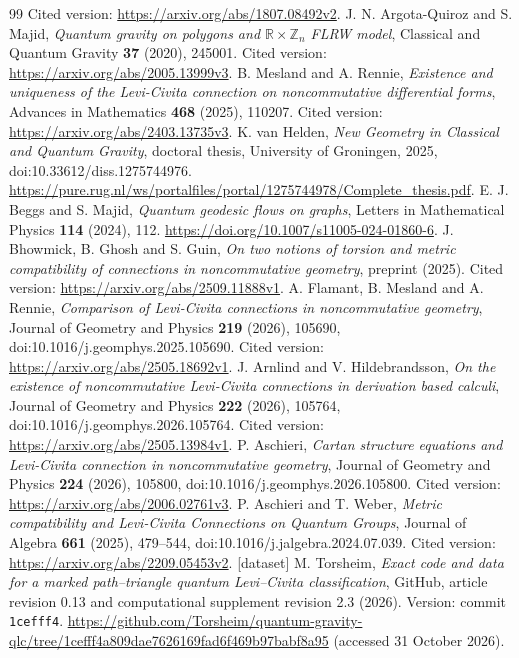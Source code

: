 \documentclass[11pt,a4paper]{article}
\theoremstyle{remark}\newtheorem{remark}[theorem]{Remark}
\begin{document}
\begin{thebibliography}{99}
Cited version: \url{https://arxiv.org/abs/1807.08492v2}.
 J. N. Argota-Quiroz and S. Majid,
\emph{Quantum gravity on polygons and $\mathbb R\times\mathbb Z_n$ FLRW model},
Classical and Quantum Gravity \textbf{37} (2020), 245001.
Cited version: \url{https://arxiv.org/abs/2005.13999v3}.
 B. Mesland and A. Rennie,
\emph{Existence and uniqueness of the Levi-Civita connection on
noncommutative differential forms},
Advances in Mathematics \textbf{468} (2025), 110207.
Cited version: \url{https://arxiv.org/abs/2403.13735v3}.
 K. van Helden,
\emph{New Geometry in Classical and Quantum Gravity}, doctoral thesis,
University of Groningen, 2025, doi:10.33612/diss.1275744976.
\url{https://pure.rug.nl/ws/portalfiles/portal/1275744978/Complete_thesis.pdf}.
 E. J. Beggs and S. Majid,
\emph{Quantum geodesic flows on graphs},
Letters in Mathematical Physics \textbf{114} (2024), 112.
\url{https://doi.org/10.1007/s11005-024-01860-6}.
 J. Bhowmick, B. Ghosh and S. Guin,
\emph{On two notions of torsion and metric compatibility of connections
in noncommutative geometry}, preprint (2025).
Cited version: \url{https://arxiv.org/abs/2509.11888v1}.
 A. Flamant, B. Mesland and A. Rennie,
\emph{Comparison of Levi-Civita connections in noncommutative geometry},
Journal of Geometry and Physics \textbf{219} (2026), 105690,
doi:10.1016/j.geomphys.2025.105690.
Cited version: \url{https://arxiv.org/abs/2505.18692v1}.
 J. Arnlind and V. Hildebrandsson,
\emph{On the existence of noncommutative Levi-Civita connections in
derivation based calculi},
Journal of Geometry and Physics \textbf{222} (2026), 105764,
doi:10.1016/j.geomphys.2026.105764.
Cited version: \url{https://arxiv.org/abs/2505.13984v1}.
 P. Aschieri,
\emph{Cartan structure equations and Levi-Civita connection in
noncommutative geometry},
Journal of Geometry and Physics \textbf{224} (2026), 105800,
doi:10.1016/j.geomphys.2026.105800.
Cited version: \url{https://arxiv.org/abs/2006.02761v3}.
 P. Aschieri and T. Weber,
\emph{Metric compatibility and Levi-Civita Connections on Quantum Groups},
Journal of Algebra \textbf{661} (2025), 479--544,
doi:10.1016/j.jalgebra.2024.07.039.
Cited version: \url{https://arxiv.org/abs/2209.05453v2}.
 [dataset] M. Torsheim,
\emph{Exact code and data for a marked path--triangle quantum
Levi--Civita classification}, GitHub, article revision 0.13 and
computational supplement revision 2.3 (2026).
Version: commit \texttt{1cefff4}.
\url{https://github.com/Torsheim/quantum-gravity-qlc/tree/1cefff4a809dae7626169fad6f469b97babf8a95}
(accessed 31 October 2026).
\end{thebibliography}
\end{document}
